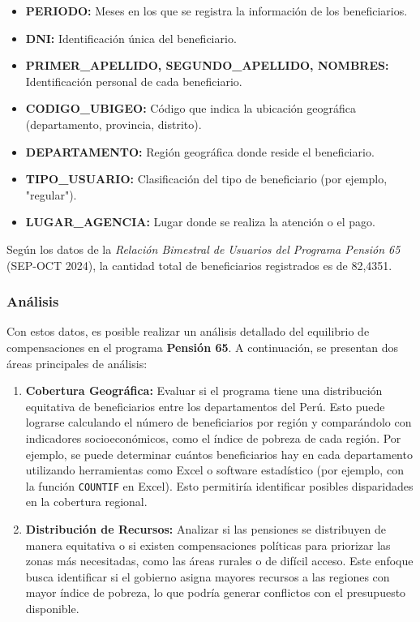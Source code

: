 \documentclass[12pt]{article}
\begin{document}
\begin{itemize}
    \item \textbf{PERIODO:} Meses en los que se registra la información de los beneficiarios.
    \item \textbf{DNI:} Identificación única del beneficiario.
    \item \textbf{PRIMER\_APELLIDO, SEGUNDO\_APELLIDO, NOMBRES:} Identificación personal de cada beneficiario.
    \item \textbf{CODIGO\_UBIGEO:} Código que indica la ubicación geográfica (departamento, provincia, distrito).
    \item \textbf{DEPARTAMENTO:} Región geográfica donde reside el beneficiario.
    \item \textbf{TIPO\_USUARIO:} Clasificación del tipo de beneficiario (por ejemplo, "regular").
    \item \textbf{LUGAR\_AGENCIA:} Lugar donde se realiza la atención o el pago.
\end{itemize}

Según los datos de la \textit{Relación Bimestral de Usuarios del Programa Pensión 65} (SEP-OCT 2024), la cantidad total de beneficiarios registrados es de 82,4351.

\subsubsection{Análisis}
Con estos datos, es posible realizar un análisis detallado del equilibrio de compensaciones en el programa \textbf{Pensión 65}. A continuación, se presentan dos áreas principales de análisis:

\begin{enumerate}
    \item \textbf{Cobertura Geográfica:}  
    Evaluar si el programa tiene una distribución equitativa de beneficiarios entre los departamentos del Perú. Esto puede lograrse calculando el número de beneficiarios por región y comparándolo con indicadores socioeconómicos, como el índice de pobreza de cada región.  
    Por ejemplo, se puede determinar cuántos beneficiarios hay en cada departamento utilizando herramientas como Excel o software estadístico (por ejemplo, con la función \texttt{COUNTIF} en Excel). Esto permitiría identificar posibles disparidades en la cobertura regional.

    \item \textbf{Distribución de Recursos:}  
    Analizar si las pensiones se distribuyen de manera equitativa o si existen compensaciones políticas para priorizar las zonas más necesitadas, como las áreas rurales o de difícil acceso. Este enfoque busca identificar si el gobierno asigna mayores recursos a las regiones con mayor índice de pobreza, lo que podría generar conflictos con el presupuesto disponible.
\end{enumerate}
\end{document}
